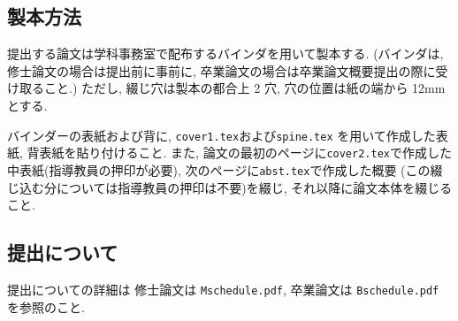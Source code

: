 \documentclass[11pt]{jarticle}
\begin{document}
\subsection{製本方法}
\noindent
提出する論文は学科事務室で配布するバインダを用いて製本する. 
(バインダは, 修士論文の場合は提出前に事前に,
卒業論文の場合は卒業論文概要提出の際に受け取ること.)
ただし, 綴じ穴は製本の都合上 2 穴, 穴の位置は紙の端から 12mm とする. 

バインダーの表紙および背に, 
{\tt cover1.tex\/}および{\tt spine.tex\/}
を用いて作成した表紙, 背表紙を貼り付けること. 
また, 論文の最初のページに{\tt cover2.tex\/}で作成した
中表紙(指導教員の押印が必要), 
次のページに{\tt abst.tex\/}で作成した概要
(この綴じ込む分については指導教員の押印は不要)を綴じ, 
それ以降に論文本体を綴じること. 

\subsection{提出について}
\noindent
提出についての詳細は
修士論文は {\tt Mschedule.pdf},
卒業論文は {\tt Bschedule.pdf} を参照のこと.
\end{document}
